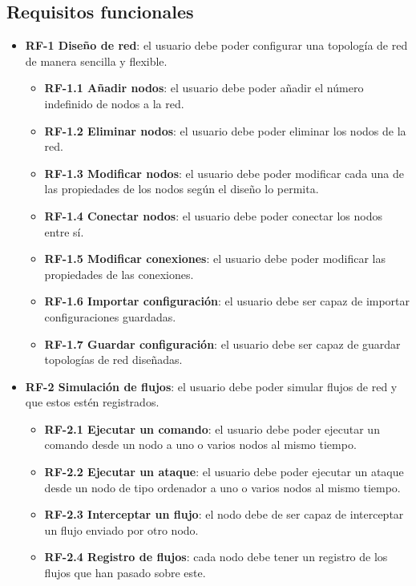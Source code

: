 \subsection{Requisitos funcionales}
\label{subsec:RequisitosFuncionales}
\begin{itemize}
    \item \textbf{RF-1 Diseño de red}: el usuario debe poder configurar una topología de red de manera sencilla y flexible.
    \begin{itemize}
        \item \textbf{RF-1.1 Añadir nodos}: el usuario debe poder añadir el número indefinido de nodos a la red.
        \item \textbf{RF-1.2 Eliminar nodos}: el usuario debe poder eliminar los nodos de la red.
        \item \textbf{RF-1.3 Modificar nodos}: el usuario debe poder modificar cada una de las propiedades de los nodos según el diseño lo permita.
        \item \textbf{RF-1.4 Conectar nodos}: el usuario debe poder conectar los nodos entre sí.
        \item \textbf{RF-1.5 Modificar conexiones}: el usuario debe poder modificar las propiedades de las conexiones.
        \item \textbf{RF-1.6 Importar configuración}: el usuario debe ser capaz de importar configuraciones guardadas.
        \item \textbf{RF-1.7 Guardar configuración}: el usuario debe ser capaz de guardar topologías de red diseñadas.
    \end{itemize}
    \item \textbf{RF-2 Simulación de flujos}: el usuario debe poder simular flujos de red y que estos estén registrados.
    \begin{itemize}
        \item \textbf{RF-2.1 Ejecutar un comando}: el usuario debe poder ejecutar un comando desde un nodo a uno o varios nodos al mismo tiempo.
        \item \textbf{RF-2.2 Ejecutar un ataque}: el usuario debe poder ejecutar un ataque desde un nodo de tipo ordenador a uno o varios nodos al mismo tiempo.
        \item \textbf{RF-2.3 Interceptar un flujo}: el nodo debe de ser capaz de interceptar un flujo enviado por otro nodo.
        \item \textbf{RF-2.4 Registro de flujos}: cada nodo debe tener un registro de los flujos que han pasado sobre este.

\end{itemize}
\end{itemize}
